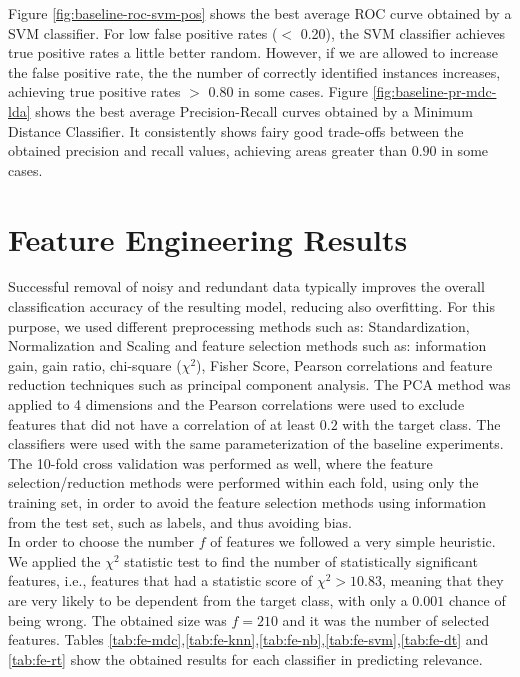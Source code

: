 Figure \ref{fig:baseline-roc-svm-pos} shows the best average ROC curve obtained by a SVM classifier. For low false positive rates ($<$ 0.20), the SVM classifier achieves true positive rates a little better random. However, if we are allowed to increase the false positive rate, the the number of correctly identified instances increases, achieving true positive rates $>$ 0.80 in some cases. Figure \ref{fig:baseline-pr-mdc-lda} shows the best average Precision-Recall curves obtained by a Minimum Distance Classifier. It consistently shows fairy good trade-offs between the obtained precision and recall values, achieving areas greater than $0.90$ in some cases. 



\section{Feature Engineering Results}
\label{sec:feature-engineering}

Successful removal of noisy and redundant data typically improves the overall classification accuracy of the resulting model, reducing also overfitting. For this purpose, we used different preprocessing methods such as: Standardization, Normalization and Scaling and feature selection methods such as: information gain, gain ratio, chi-square ($\chi^2$), Fisher Score, Pearson correlations and feature reduction techniques such as principal component analysis. The PCA method was applied to 4 dimensions and the Pearson correlations were used to exclude features that did not have a correlation of at least $0.2$ with the target class. The classifiers were used with the same parameterization of the baseline experiments. The 10-fold cross validation was performed as well, where the feature selection/reduction methods were performed within each fold, using only the training set, in order to avoid the feature selection methods using information from the test set, such as labels, and thus avoiding bias. \\
In order to choose the number $f$ of features we followed a very simple heuristic. We applied the $\chi^2$ statistic test to find the number of statistically significant features, i.e., features that had a statistic score of $\chi^2 > 10.83$, meaning that they are very likely to be dependent from the target class, with only a $0.001$ chance of being wrong. The obtained size was $f = 210$ and it was the number of selected features. Tables \ref{tab:fe-mdc},\ref{tab:fe-knn},\ref{tab:fe-nb},\ref{tab:fe-svm},\ref{tab:fe-dt} and \ref{tab:fe-rt} show the obtained results for each classifier in predicting relevance.

